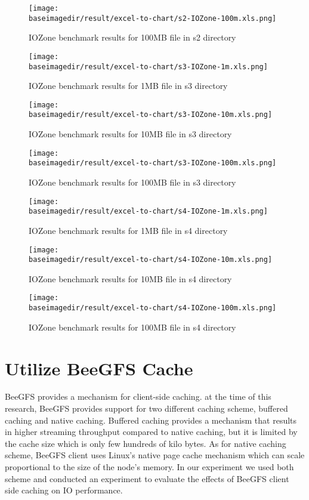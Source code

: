 \documentclass{article}
\newcommand{\baseimagedir}{..}
\begin{document}
\begin{figure}
    \centering
    \texttt{[image: \\baseimagedir/result/excel-to-chart/s2-IOZone-100m.xls.png]}
    \caption{IOZone benchmark results for 100MB file in s2 directory}
    \label{fig:s2-100m}
\end{figure}

\begin{figure}
    \centering
    \texttt{[image: \\baseimagedir/result/excel-to-chart/s3-IOZone-1m.xls.png]}
    \caption{IOZone benchmark results for 1MB file in s3 directory}
    \label{fig:s3-1m}
\end{figure}

\begin{figure}
    \centering
    \texttt{[image: \\baseimagedir/result/excel-to-chart/s3-IOZone-10m.xls.png]}
    \caption{IOZone benchmark results for 10MB file in s3 directory}
    \label{fig:s3-10m}
\end{figure}

\begin{figure}
    \centering
    \texttt{[image: \\baseimagedir/result/excel-to-chart/s3-IOZone-100m.xls.png]}
    \caption{IOZone benchmark results for 100MB file in s3 directory}
    \label{fig:s3-100m}
\end{figure}

\begin{figure}
    \centering
    \texttt{[image: \\baseimagedir/result/excel-to-chart/s4-IOZone-1m.xls.png]}
    \caption{IOZone benchmark results for 1MB file in s4 directory}
    \label{fig:s4-1m}
\end{figure}

\begin{figure}
    \centering
    \texttt{[image: \\baseimagedir/result/excel-to-chart/s4-IOZone-10m.xls.png]}
    \caption{IOZone benchmark results for 10MB file in s4 directory}
    \label{fig:s4-10m}
\end{figure}

\begin{figure}
    \centering
    \texttt{[image: \\baseimagedir/result/excel-to-chart/s4-IOZone-100m.xls.png]}
    \caption{IOZone benchmark results for 100MB file in s4 directory}
    \label{fig:s4-100m}
\end{figure}

\section{Utilize BeeGFS Cache}
BeeGFS provides a mechanism for client-side caching. at the time of this research, BeeGFS provides support for two different caching scheme, buffered caching and native caching. Buffered caching provides a mechanism that results in higher streaming throughput compared to native caching, but it is limited by the cache size which is only few hundreds of kilo bytes. As for native caching scheme, BeeGFS client uses Linux's native page cache mechanism which can scale proportional to the size of the node's memory. In our experiment we used both scheme and conducted an experiment to evaluate the effects of BeeGFS client side caching on IO performance.
\end{document}
